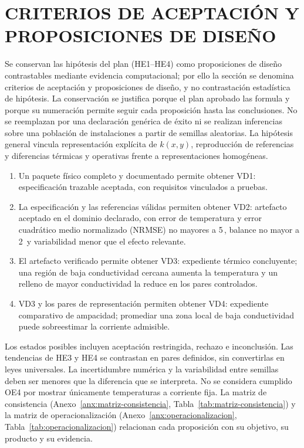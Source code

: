 \section{CRITERIOS DE ACEPTACIÓN Y PROPOSICIONES DE DISEÑO}

Se conservan las hipótesis del plan (HE1--HE4) como proposiciones de diseño contrastables mediante evidencia computacional; por ello la sección se denomina criterios de aceptación y proposiciones de diseño, y no contrastación estadística de hipótesis. La conservación se justifica porque el plan aprobado las formula y porque su numeración permite seguir cada proposición hasta las conclusiones. No se reemplazan por una declaración genérica de éxito ni se realizan inferencias sobre una población de instalaciones a partir de semillas aleatorias. La hipótesis general vincula representación explícita de $k(x,y)$, reproducción de referencias y diferencias térmicas y operativas frente a representaciones homogéneas.

\begin{enumerate}[label=HE\arabic*.]
\item Un paquete físico completo y documentado permite obtener VD1: especificación trazable aceptada, con requisitos vinculados a pruebas.
\item La especificación y las referencias válidas permiten obtener VD2: artefacto aceptado en el dominio declarado, con error de temperatura y error cuadrático medio normalizado (NRMSE) no mayores a 5\,\pct{}, balance no mayor a 2\,\pct{} y variabilidad menor que el efecto relevante.
\item El artefacto verificado permite obtener VD3: expediente térmico concluyente; una región de baja conductividad cercana aumenta la temperatura y un relleno de mayor conductividad la reduce en los pares controlados.
\item VD3 y los pares de representación permiten obtener VD4: expediente comparativo de ampacidad; promediar una zona local de baja conductividad puede sobreestimar la corriente admisible.
\end{enumerate}

Los estados posibles incluyen aceptación restringida, rechazo e inconclusión. Las tendencias de HE3 y HE4 se contrastan en pares definidos, sin convertirlas en leyes universales. La incertidumbre numérica y la variabilidad entre semillas deben ser menores que la diferencia que se interpreta. No se considera cumplido OE4 por mostrar únicamente temperaturas a corriente fija. La matriz de consistencia (Anexo~\ref{anx:matriz-consistencia}, Tabla~\ref{tab:matriz-consistencia}) y la matriz de operacionalización (Anexo~\ref{anx:operacionalizacion}, Tabla~\ref{tab:operacionalizacion}) relacionan cada proposición con su objetivo, su producto y su evidencia.

